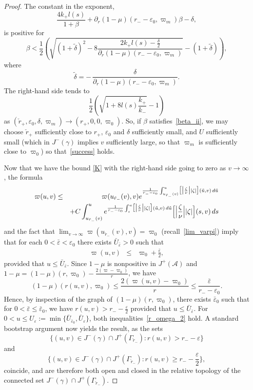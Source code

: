 \documentclass[a4paper,11pt,oneside,reqno]{amsart}
\newcommand{\kk}{k_+}
\newcommand{\kkk}{k_-}
\newcommand{\cal}{\mathcal}
\newcommand{\eps}{\varepsilon}
\newcommand{\ckrm}{\check r_-}
\newcommand{\ckrp}{\check r_+}
\newcommand{\ugr}{u_{\ckrm}}
\begin{document}
\begin{proof}
The constant in the exponent,
\begin{equation}\label{exponent}
\frac{4\kk l(s)}{1+\beta}+\partial_r(1-\mu)(r_--\eps_0,\varpi_m)\beta-\delta,
\end{equation}
is positive for 
\begin{equation}\label{success} 
\textstyle
\beta<\frac 12\left(
\sqrt{(1+\tilde\delta)^2-8
\frac{2\kk l(s)-\frac{\delta}{2}}{\partial_r(1-\mu)(r_--\eps_0,\varpi_m)}}-(1+\tilde\delta)
\right),
\end{equation}
where
$$
\textstyle
\tilde{\delta}=-\,\frac{\delta}{\partial_r(1-\mu)(r_--\eps_0,\varpi_m)}.
$$
The right-hand side tends to
$$
{\textstyle\frac 12\left(\sqrt{1+8l(s)\frac{\kk}{\kkk}}-1\right)}
$$
as $(\ckrp,\eps_0,\delta,\varpi_m)\to(r_+,0,0,\varpi_0)$.
So, if $\beta$ satisfies~\eqref{beta_ii}, we may choose $\ckrp$
sufficiently close to $r_+$, $\eps_0$ and $\delta$
sufficiently small, and
$U$ sufficiently small (which in $J^-(\gamma)$ implies $v$ sufficiently large,
so that $\varpi_m$
is sufficiently close to $\varpi_0$) so that~\eqref{success} holds.

Now that we have the bound \eqref{K} with the right-hand side going to zero as $v \to \infty$,
the formula
\begin{eqnarray*}
\varpi(u,v)&\leq&
\varpi(\ugr(v),v)e^{\frac{1}{r_--\eps_0}\int_{\ugr(v)}^u\bigl[\bigl|\frac\zeta\nu\bigr||\zeta|\bigr](\tilde u,v)\,d\tilde u}\\
&&+C 
\int_{\ugr(v)}^ue^{\frac{1}{r_--\eps_0}\int_{s}^u\bigl[\bigl|\frac\zeta\nu\bigr||\zeta|\bigr](\tilde u,v)\,d\tilde u}
\Bigl[\Bigl|\frac\zeta\nu\Bigr||\zeta|\Bigr](s,v)\,ds
\end{eqnarray*}
and the fact that $\lim_{v\to\infty}\varpi(\ugr(v),v)=\varpi_0$ (recall~\eqref{lim_varpi}) imply that for each $0 <\bar\eps < \eps_0$ there exists $\bar U_{\bar\eps} > 0$ such that
\begin{eqnarray*}
\varpi(u,v)
&\leq&\varpi_0+{\textstyle\frac{\bar\eps} 2},
\end{eqnarray*}
provided that  $u\leq\bar U_{\bar\eps}$.
Since $1-\mu$
is nonpositive in $J^+({\cal A})$ and $1-\mu=(1-\mu)(r,\varpi_0)-\frac{2(\varpi-\varpi_0)}{r}$, we have
$$\textstyle
(1-\mu)(r(u,v),\varpi_0)\leq\frac{2(\varpi(u,v)-\varpi_0)}{r}\leq\frac{\bar\eps}{r_--\eps_0}.
$$
Hence, by inspection of the graph of $(1-\mu)(r,\varpi_0)$, there exists $\bar\eps_0$ such that for $0<\bar\eps\leq\bar\eps_0$, we have $r(u,v)>r_--\frac\eps 2$ provided that  $u\leq\bar U_{\bar\eps}$.
For $0<u\leq U_\eps:=\min\{\bar U_{\bar\eps_0},\bar U_\eps\}$, both inequalities~\eqref{r_omega_2} hold. A standard bootstrap argument now yields the result, as the sets
\[
\{ (u,v)\in J^-(\gamma)\cap J^+(\Gamma_{\ckrm}) : r(u,v) > r_--\eps \}
\]
and
\[
\{ (u,v)\in J^-(\gamma)\cap J^+(\Gamma_{\ckrm}) : r(u,v) \geq r_--{\textstyle\frac\eps 2} \},
\]
coincide, and are therefore both open and closed in the relative topology of the connected set $J^-(\gamma)\cap J^+(\Gamma_{\ckrm})$.
\end{proof}
\end{document}
